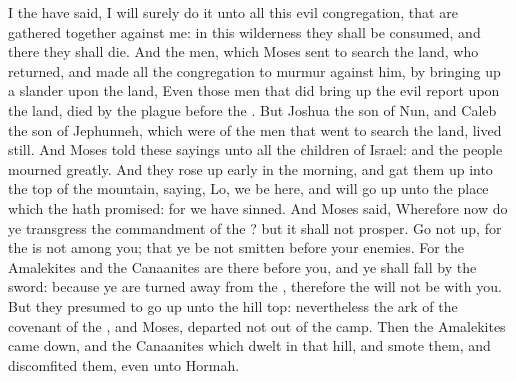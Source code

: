 \begin{biblechapter}
\verse I the \LORD have said, I will surely do it unto all this evil congregation, that are gathered together against me: in this wilderness they shall be consumed, and there they shall die.
\verse And the men, which Moses sent to search the land, who returned, and made all the congregation to murmur against him, by bringing up a slander upon the land,
\verse Even those men that did bring up the evil report upon the land, died by the plague before the \LORD.
\verse But Joshua the son of Nun, and Caleb the son of Jephunneh, which were of the men that went to search the land, lived still.
\verse And Moses told these sayings unto all the children of Israel: and the people mourned greatly.
\verse And they rose up early in the morning, and gat them up into the top of the mountain, saying, Lo, we be here, and will go up unto the place which the \LORD hath promised: for we have sinned.
\verse And Moses said, Wherefore now do ye transgress the commandment of the \LORD? but it shall not prosper.
\verse Go not up, for the \LORD is not among you; that ye be not smitten before your enemies.
\verse For the Amalekites and the Canaanites are there before you, and ye shall fall by the sword: because ye are turned away from the \LORD, therefore the \LORD will not be with you.
\verse But they presumed to go up unto the hill top: nevertheless the ark of the covenant of the \LORD, and Moses, departed not out of the camp.
\verse Then the Amalekites came down, and the Canaanites which dwelt in that hill, and smote them, and discomfited them, even unto Hormah.
\end{biblechapter}

